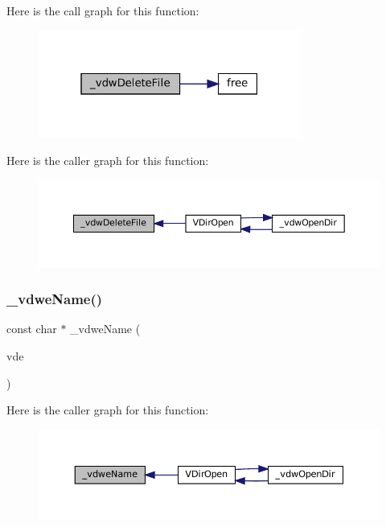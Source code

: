 Here is the call graph for this function\+:
\nopagebreak
\begin{figure}[H]
\begin{center}
\leavevmode
\includegraphics[width=244pt]{vfs-w32_8c_a2d2d07ef2c4dd06024930003a76dbf33_cgraph}
\end{center}
\end{figure}
Here is the caller graph for this function\+:
\nopagebreak
\begin{figure}[H]
\begin{center}
\leavevmode
\includegraphics[width=350pt]{vfs-w32_8c_a2d2d07ef2c4dd06024930003a76dbf33_icgraph}
\end{center}
\end{figure}
\mbox{\label{vfs-w32_8c_a1934e51aba094c34fa52f1fc7ed8505b}} 
\subsubsection{\texorpdfstring{\+\_\+vdwe\+Name()}{\_vdweName()}}
{\footnotesize\ttfamily const char $\ast$ \+\_\+vdwe\+Name (\begin{DoxyParamCaption}\item[{struct V\+Dir\+Entry $\ast$}]{vde }\end{DoxyParamCaption})\hspace{0.3cm}{\ttfamily [static]}}

Here is the caller graph for this function\+:
\nopagebreak
\begin{figure}[H]
\begin{center}
\leavevmode
\includegraphics[width=350pt]{vfs-w32_8c_a1934e51aba094c34fa52f1fc7ed8505b_icgraph}
\end{center}
\end{figure}
\mbox{\label{vfs-w32_8c_a70662c6113d4ab96de82bb863ef01d87}} 
